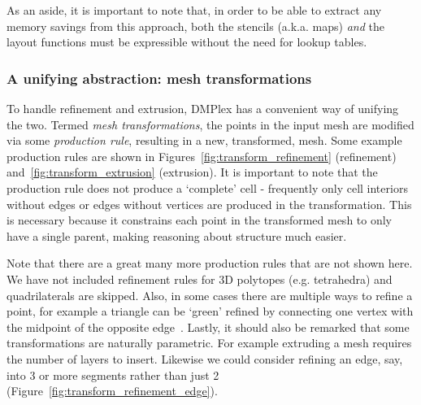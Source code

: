 As an aside, it is important to note that, in order to be able to extract any memory savings from this approach, both the stencils (a.k.a. maps) \textit{and} the layout functions must be expressible without the need for lookup tables.

\subsubsection{A unifying abstraction: mesh transformations}

To handle refinement and extrusion, DMPlex has a convenient way of unifying the two.
Termed \textit{mesh transformations}, the points in the input mesh are modified via some \textit{production rule}, resulting in a new, transformed, mesh.
Some example production rules are shown in Figures~\ref{fig:transform_refinement} (refinement) and~\ref{fig:transform_extrusion} (extrusion).
It is important to note that the production rule does not produce a `complete' cell - frequently only cell interiors without edges or edges without vertices are produced in the transformation.
This is necessary because it constrains each point in the transformed mesh to only have a single parent, making reasoning about structure much easier.

Note that there are a great many more production rules that are not shown here.
We have not included refinement rules for 3D polytopes (e.g. tetrahedra) and quadrilaterals are skipped.
Also, in some cases there are multiple ways to refine a point, for example a triangle can be `green' refined by connecting one vertex with the midpoint of the opposite edge~\cite{bankRefinementAlgorithmDynamic}.
Lastly, it should also be remarked that some transformations are naturally parametric.
For example extruding a mesh requires the number of layers to insert.
Likewise we could consider refining an edge, say, into 3 or more segments rather than just 2 (Figure~\ref{fig:transform_refinement_edge}).

